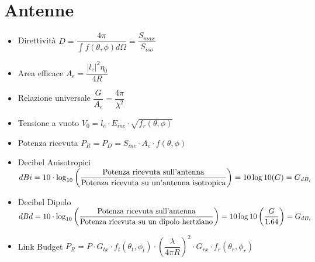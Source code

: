 \documentclass{article}
\begin{document}
\newpage

\section{Antenne}
\begin{itemize}
	\item Direttività \( \displaystyle D = \dfrac{4 \pi}{\int{f(\theta, \phi) d \Omega}} = \dfrac{S_{max}}{S_{iso}} \)	
	\item Area efficace \( \displaystyle A_e = \dfrac{|l_e| ^ 2 \eta_0}{4 R} \)
	\item Relazione universale \( \dfrac{G}{A_e} = \dfrac{4 \pi}{\lambda^2} \)
	\item Tensione a vuoto \( V_0 = l_e \cdot E_{inc} \cdot \sqrt{f_r(\theta, \phi)} \)
	\item Potenza ricevuta \(P_R = P_D = S_{inc} \cdot A_e \cdot  f(\theta, \phi) \)
	\item Decibel Anisotropici \(dBi = 10 \cdot \log_{10} \left( \dfrac{\textnormal{Potenza ricevuta sull'antenna}}{\textnormal{Potenza ricevuta su un'antenna isotropica}} \right) = 10 \log{10} (G) = G_{dB_i}\)
	\item Decibel Dipolo  \(dBd = 10 \cdot \log_{10} \left( \dfrac{\textnormal{Potenza ricevuta sull'antenna}}{\textnormal{Potenza ricevuta su un dipolo hertziano}} \right) = 10 \log{10} \left( \dfrac{G}{1.64} \right) = G_{dB_i}\)
	\item Link Budget \(P_R = P \cdot G_{tx} \cdot f_t (\theta_t, \phi_t) \cdot \left( \dfrac{\lambda}{4 \pi R} \right) ^ 2 \cdot G_{rx} \cdot f_r (\theta_r, \phi_r) \)
\end{itemize}
\end{document}
